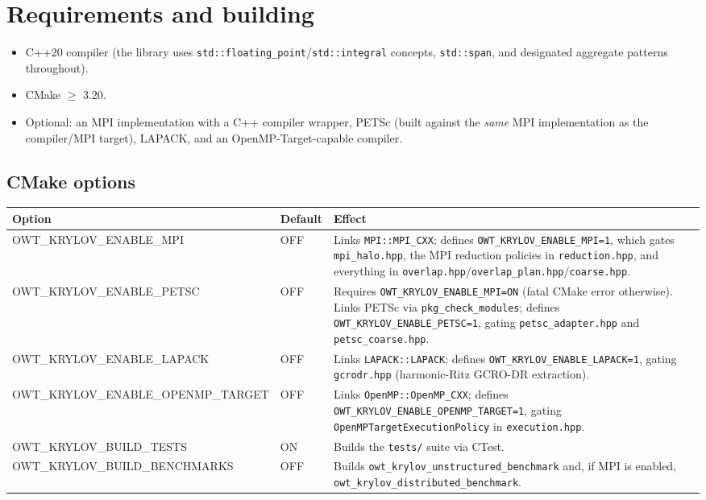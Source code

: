 \documentclass[11pt,a4paper]{report}
\begin{document}
\chapter{Requirements and building}
\label{sec:2}

\begin{itemize}
\item C++20 compiler (the library uses \lstinline!std::floating_point!/\lstinline!std::integral!
  concepts, \lstinline!std::span!, and designated aggregate patterns throughout).
\item CMake $\geq$ 3.20.
\item Optional: an MPI implementation with a C++ compiler wrapper,
  PETSc (built against the \emph{same} MPI implementation as the compiler/MPI
  target), LAPACK, and an OpenMP-Target-capable compiler.
\end{itemize}

\section{CMake options}
\label{sec:2.1}

\begin{longtable}{L{0.30\textwidth}C{0.08\textwidth}P{0.52\textwidth}}
\toprule
Option & Default & Effect \\
\midrule
\endhead
OWT\_KRYLOV\_ENABLE\_MPI & OFF & Links \lstinline!MPI::MPI_CXX!; defines \lstinline!OWT_KRYLOV_ENABLE_MPI=1!, which gates \texttt{mpi\_halo.hpp}, the MPI reduction policies in \texttt{reduction.hpp}, and everything in \texttt{overlap.hpp}/\texttt{overlap\_plan.hpp}/\texttt{coarse.hpp}. \\
OWT\_KRYLOV\_ENABLE\_PETSC & OFF & Requires \lstinline!OWT_KRYLOV_ENABLE_MPI=ON! (fatal CMake error otherwise). Links PETSc via \lstinline!pkg_check_modules!; defines \lstinline!OWT_KRYLOV_ENABLE_PETSC=1!, gating \texttt{petsc\_adapter.hpp} and \texttt{petsc\_coarse.hpp}. \\
OWT\_KRYLOV\_ENABLE\_LAPACK & OFF & Links \lstinline!LAPACK::LAPACK!; defines \lstinline!OWT_KRYLOV_ENABLE_LAPACK=1!, gating \texttt{gcrodr.hpp} (harmonic-Ritz GCRO-DR extraction). \\
OWT\_KRYLOV\_ENABLE\_OPENMP\_TARGET & OFF & Links \lstinline!OpenMP::OpenMP_CXX!; defines \lstinline!OWT_KRYLOV_ENABLE_OPENMP_TARGET=1!, gating \lstinline!OpenMPTargetExecutionPolicy! in \texttt{execution.hpp}. \\
OWT\_KRYLOV\_BUILD\_TESTS & ON & Builds the \texttt{tests/} suite via CTest. \\
OWT\_KRYLOV\_BUILD\_BENCHMARKS & OFF & Builds \lstinline!owt_krylov_unstructured_benchmark! and, if MPI is enabled, \lstinline!owt_krylov_distributed_benchmark!. \\
\bottomrule
\end{longtable}
\end{document}

